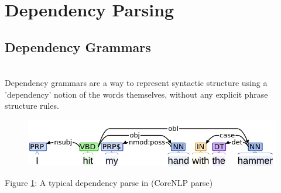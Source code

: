\documentclass[]{article}
\begin{document}
\section{Dependency Parsing}
\subsection{Dependency Grammars}
\\

Dependency grammars are a way to represent syntactic structure using a 'dependency' notion of the words themselves, without any explicit phrase structure rules.

\begin{figure}[h!]
	\begin{center}
		\includegraphics[width=0.6\linewidth]{./images/dependency.png}
		\label{fig:dep1}
		\end{center}
\end{figure}

\begin{center}
Figure \ref{fig:dep1}: A typical dependency parse in (CoreNLP parse)
\end{center}
\end{document}
